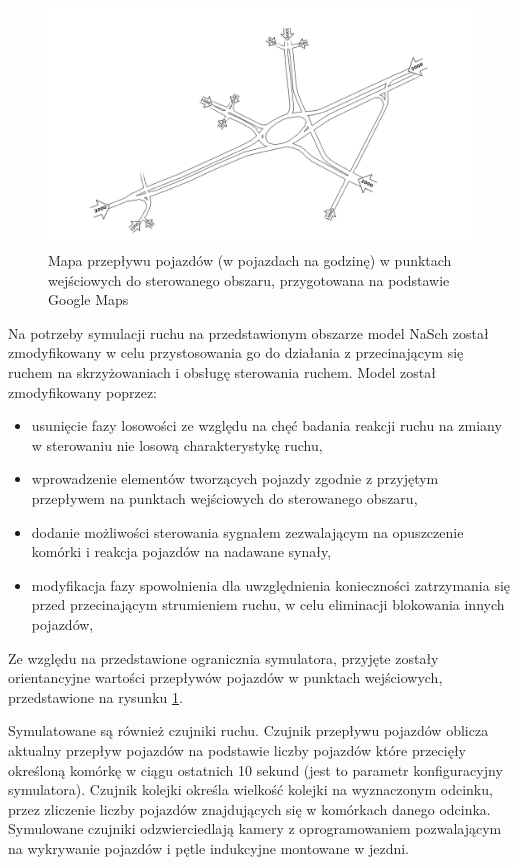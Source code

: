 \begin{figure}[h]
    \centering
    \includegraphics[width=1.0\textwidth]{images/mapa_ruch.png}
    \caption{Mapa przepływu pojazdów (w pojazdach na godzinę) w punktach wejściowych do sterowanego obszaru, przygotowana na podstawie Google Maps \cite{google_maps}}
    \label{fig:mapa_ruch}
\end{figure}

Na potrzeby symulacji ruchu na przedstawionym obszarze model NaSch został zmodyfikowany w celu przystosowania go do działania z przecinającym się ruchem na skrzyżowaniach i obsługę sterowania ruchem. Model został zmodyfikowany poprzez:
\begin{itemize}
	\item usunięcie fazy losowości ze względu na chęć badania reakcji ruchu na zmiany w sterowaniu nie losową charakterystykę ruchu,
	\item wprowadzenie elementów tworzących pojazdy zgodnie z przyjętym przepływem na punktach wejściowych do sterowanego obszaru,
	\item dodanie możliwości sterowania sygnałem zezwalającym na opuszczenie komórki i reakcja pojazdów na nadawane synały,
	\item modyfikacja fazy spowolnienia dla uwzględnienia konieczności zatrzymania się przed przecinającym strumieniem ruchu, w celu eliminacji blokowania innych pojazdów,
\end{itemize}

Ze względu na przedstawione ogranicznia symulatora, przyjęte zostały orientancyjne wartości przepływów pojazdów w punktach wejściowych, przedstawione na rysunku \ref{fig:mapa_ruch}.

Symulatowane są również czujniki ruchu. Czujnik przepływu pojazdów oblicza aktualny przepływ pojazdów na podstawie liczby pojazdów które przecięły określoną komórkę w ciągu ostatnich 10 sekund (jest to parametr konfiguracyjny symulatora). Czujnik kolejki określa wielkość kolejki na wyznaczonym odcinku, przez zliczenie liczby pojazdów znajdujących się w komórkach danego odcinka. Symulowane czujniki odzwierciedlają kamery z oprogramowaniem pozwalającym na wykrywanie pojazdów i pętle indukcyjne montowane w jezdni.

